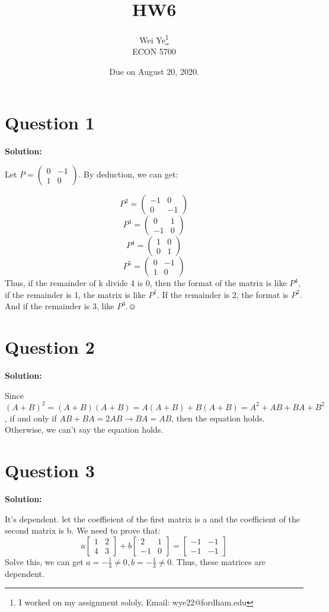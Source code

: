 \documentclass[11pt]{article} %
\title{HW6}
\author{Wei Ye\footnote{I worked on my assignment sololy. Email: wye22@fordham.edu}  	\\
	ECON 5700}
\date{Due on August 20, 2020.}
\begin{document}
	\maketitle
	\section{Question 1}
	\textbf{Solution:}

Let $P=
\begin{pmatrix}
	0&-1\\
	1&0
\end{pmatrix}$. By deduction, we can get:

$$P^2=\begin{pmatrix}
	-1&0\\
	0&-1
\end{pmatrix}$$
$$P^3=\begin{pmatrix}
	0&1\\
	-1&0
\end{pmatrix}$$
$$P^4=\begin{pmatrix}
	1&0\\
	0&1
\end{pmatrix}$$
$$P^5=\begin{pmatrix}
	0&-1\\
	1&0
\end{pmatrix}$$
	Thus, if the remainder of  k divide 4 is 0, then the format of the matrix is like $P^4$, if the remainder is 1, the matrix is like $P^1$. If the remainder is 2, the format is $P^2$. And if the remainder is 3, like $P^3$.$\smiley$


\section{Question 2}
\textbf{Solution:}

Since $(A+B)^2=(A+B)(A+B)=A(A+B)+B(A+B)=A^2+AB+BA+B^2$, if and only if $AB+BA=2AB \longrightarrow  BA=AB$, then the equation holds. Otherwise, we can't say the equation holds.

\section{Question 3}
\textbf{Solution:}

It's dependent. 
let the coeffieient of the first matrix is a and the coefficient of the second matrix is b. We need to prove that:
$$a\begin{bmatrix}
	1&2\\
	4&3
\end{bmatrix}	+b\begin{bmatrix}
2&1\\
-1&0
\end{bmatrix}=\begin{bmatrix}
-1&-1\\
-1&-1
\end{bmatrix}$$
Solve this, we can get $a=-\frac{1}{3}\neq 0, b=-\frac{1}{3}\neq0$. Thus, these matrices are dependent. 
\end{document}

